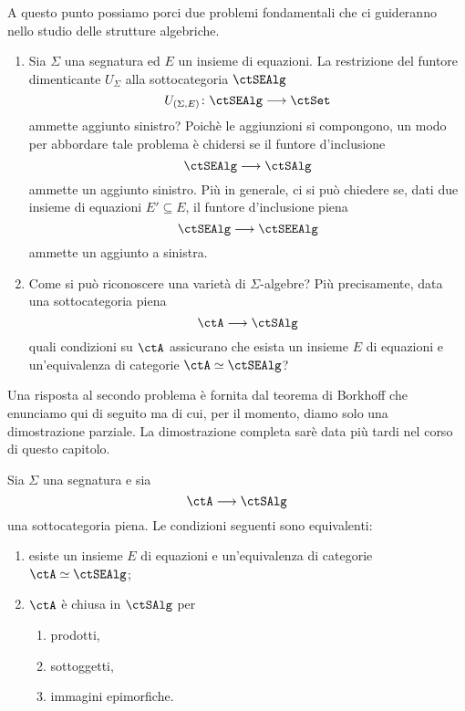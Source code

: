 A questo punto possiamo porci due problemi fondamentali che ci guideranno nello studio delle strutture algebriche.
\begin{enumerate}
	\item Sia \(\Sigma\) una segnatura ed \(E\) un insieme di equazioni. La restrizione del funtore dimenticante \(U_{\Sigma}\)
	      alla sottocategoria \(\ctSEAlg\)
	      \[
		      U_{(\Sigma,E)} \colon \ctSEAlg \fun \ctSet
	      \]
	      ammette aggiunto sinistro? Poichè le aggiunzioni si compongono, un modo per abbordare tale problema è chidersi
	      se il funtore d'inclusione
	      \[
		      \ctSEAlg \fun \ctSAlg
	      \]
	      ammette un aggiunto sinistro. Più in generale, ci si può chiedere se, dati due insieme di equazioni \(E' \subseteq E\),
	      il funtore d'inclusione piena
	      \[
		      \ctSEAlg \fun \ctSEEAlg
	      \]
	      ammette un aggiunto a sinistra.
	\item Come si può riconoscere una varietà di \(\Sigma\)-algebre? Più precisamente, data una sottocategoria piena
	      \[
		      \ctA \fun \ctSAlg
	      \]
	      quali condizioni su \(\ctA\) assicurano che esista un insieme \(E\) di equazioni e un'equivalenza di categorie \(\ctA \simeq \ctSEAlg\)?
\end{enumerate}

Una risposta al secondo problema è fornita dal teorema di Borkhoff che enunciamo qui di seguito ma di cui, per il momento,
diamo solo una dimostrazione parziale. La dimostrazione completa sarè data più tardi nel corso di questo capitolo.

\begin{theorem}\label{teo_Birkhoff_v1}
	Sia \(\Sigma\) una segnatura e sia
	\[
		\ctA \fun \ctSAlg
	\]
	una sottocategoria piena. Le condizioni seguenti sono equivalenti:
	\begin{enumerate}
		\item esiste un insieme \(E\) di equazioni e un'equivalenza di categorie \(\ctA \simeq \ctSEAlg\);
		\item \(\ctA\) è chiusa in \(\ctSAlg\) per
		      \begin{enumerate}
			      \item prodotti,
			      \item sottoggetti,
			      \item immagini epimorfiche.
		      \end{enumerate}
	\end{enumerate}
\end{theorem}


